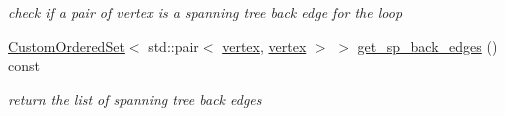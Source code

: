 \begin{DoxyCompactItemize}
\begin{DoxyCompactList}\small\item\em check if a pair of vertex is a spanning tree back edge for the loop \end{DoxyCompactList}\item 
\hyperlink{classCustomOrderedSet}{Custom\+Ordered\+Set}$<$ std\+::pair$<$ \hyperlink{graph_8hpp_abefdcf0544e601805af44eca032cca14}{vertex}, \hyperlink{graph_8hpp_abefdcf0544e601805af44eca032cca14}{vertex} $>$ $>$ \hyperlink{classLoop_a162a9e6c7e0822bdf19965fa759bdd17}{get\+\_\+sp\+\_\+back\+\_\+edges} () const
\begin{DoxyCompactList}\small\item\em return the list of spanning tree back edges \end{DoxyCompactList}\end{DoxyCompactItemize}
